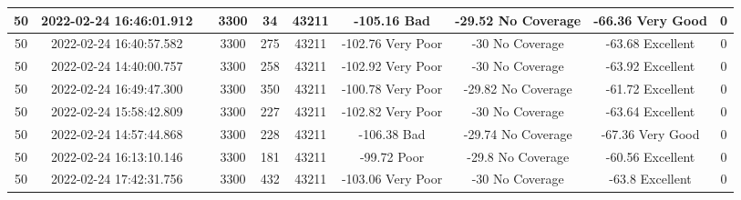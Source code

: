 \begin{longtable*}{|c|c|c|c|c|c|c|c|c|c|}
50&2022-02-24 16:46:01.912&&3300&34&43211& -105.16   Bad         & -29.52    No Coverage & -66.36    Very Good   & 0\\\hline
{}50&2022-02-24 16:40:57.582&&3300&275&43211& -102.76   Very Poor   & -30       No Coverage & -63.68    Excellent   & 0\\\hline
{}50&2022-02-24 14:40:00.757&&3300&258&43211& -102.92   Very Poor   & -30       No Coverage & -63.92    Excellent   & 0\\\hline
{}50&2022-02-24 16:49:47.300&&3300&350&43211& -100.78   Very Poor   & -29.82    No Coverage & -61.72    Excellent   & 0\\\hline
{}50&2022-02-24 15:58:42.809&&3300&227&43211& -102.82   Very Poor   & -30       No Coverage & -63.64    Excellent   & 0\\\hline
{}50&2022-02-24 14:57:44.868&&3300&228&43211& -106.38   Bad         & -29.74    No Coverage & -67.36    Very Good   & 0\\\hline
{}50&2022-02-24 16:13:10.146&&3300&181&43211& -99.72    Poor        & -29.8     No Coverage & -60.56    Excellent   & 0\\\hline
{}50&2022-02-24 17:42:31.756&&3300&432&43211& -103.06   Very Poor   & -30       No Coverage & -63.8     Excellent   & 0\\\hline

\end{longtable*}
